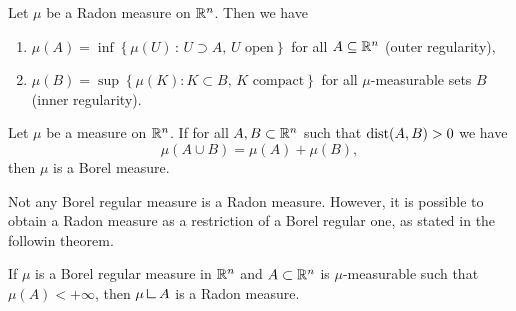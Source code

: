 \begin{theorem} \label{thm:regularity_Radon}
Let $\mu$ be a Radon measure on $\mathbb{R}^n$. Then we have
\begin{enumerate}[(1)]
\item $\mu(A) = \inf\left\{ \mu(U) \,:\,
U \supset A,\, U \text{ open}\right\}$ for all $A \subseteq \mathbb{R}^n$ \hfill (outer regularity),
\item $\mu(B) = \sup \left\{ \mu (K): K \subset B,\, K \text{ compact}\right\}$ for all $\mu$-measurable sets $B$ \hfill
(inner regularity).
\end{enumerate}
\end{theorem}

\begin{theorem} \label{caratheodory_criterion}
Let $\mu$ be a measure on $\mathbb{R}^n$. If for all $A,B \subset \mathbb{R}^n$ such that $\operatorname{dist}(A,B) > 0$ we have $$\mu(A \cup B) = \mu(A) + \mu(B),$$ then $\mu$
is a Borel measure.
\end{theorem}

Not any Borel regular measure is a Radon measure. However, it is possible to obtain a Radon measure as a restriction of a Borel regular one, as stated in the followin theorem.

\begin{theorem} \label{thm:Borel_restriction_Radon}
If $\mu$ is a Borel regular measure in $\mathbb{R}^n$ and $A \subset \mathbb{R}^n$ is
$\mu$-measurable such that $\mu(A) < + \infty$, then $\mu \res A$ is a Radon measure. 
\end{theorem}

